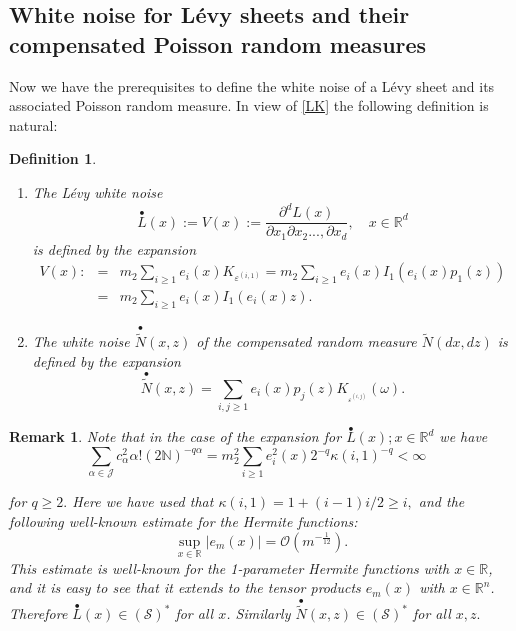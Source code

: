 \documentclass[12pt]{article}%
\newtheorem{definition}[theorem]{Definition}
\newtheorem{remark}[theorem]{Remark}
\numberwithin{equation}{section}
\def\R{\mathbb{R}}
\begin{document}
\subsection{White noise for L\' evy sheets and their compensated Poisson random measures}
Now we have the prerequisites to define the white noise of a L\'evy sheet and its associated Poisson random measure. In view of \eqref{LK} the following definition is natural:

\begin{definition} 
\begin{enumerate}
\item[(i)]
The \emph{L\'{e}vy white noise}
$$\overset{\bullet }{L
}(x):=V(x):= \frac{\partial^d L(x)}{\partial x_1 \partial x_2  ... ,\partial x_d},\quad x\in \R^d$$
is defined by the expansion
\begin{eqnarray}
V(x):&=&m_{2}\sum_{i\geq 1}e _{i}(x)K_{\varepsilon
^{(i,1)}}=m_{2}\sum_{i\geq 1}e _{i}(x)I_{1}(e _{i}(x)p_{1}(z))\nonumber\\
&=&m_{2}\sum_{i\geq 1}e _{i}(x)I_{1}(e _{i}(x)z).  
\end{eqnarray}%

\item[(ii)]
The \emph{white noise} $\overset{\bullet }{\widetilde{N}%
}(x,z)$ of the compensated random measure  $\widetilde{N}(dx,dz)$ is defined by the expansion%
\begin{equation}
\overset{\bullet }{\widetilde{N}}(x,z)=\sum_{i,j\geq 1}e
_{i}(x)p_{j}(z)K_{_{\varepsilon ^{(i,j)}}}(\omega ).  
\end{equation}
\end{enumerate}
\end{definition}




\begin{remark}
\label{Rem10.6}Note that in the case of the expansion for $\overset{\bullet }{L}(x); x \in \R^d$ we have%
\[
\sum_{\alpha \in \mathcal{J}}c_{\alpha }^{2}\alpha !(2\mathbb{N})^{-q\alpha
}=m_{2}^{2}\sum_{i\geq 1}e _{i}^{2}(x) 2^{-q}\kappa (i,1)^{-q}<\infty \text{ }
\]%

for $q\geq 2.$ Here we have used that $\kappa (i,1)=1+(i-1)i/2\geq i,$  and the following
well-known estimate for the Hermite functions:%
\begin{equation}
\sup_{x\in \mathbb{R}}\left\vert e _{m}(x)\right\vert =\mathcal{O}(m^{-\frac{1}{12}%
}).
\end{equation}%
This estimate is well-known for the 1-parameter Hermite functions with $x \in \R$, and it is easy to see that it extends to the tensor products $e_m(x)$ with $x \in \R^n$.
Therefore $\overset{\bullet }{L}(x)\in (\mathcal{S})^{* }$ for all $x$.
 Similarly $\overset{\bullet }{\widetilde{N}}(x,z)\in (\mathcal{S})^{* }$
for all $x,z.$
\end{remark}
\end{document}
